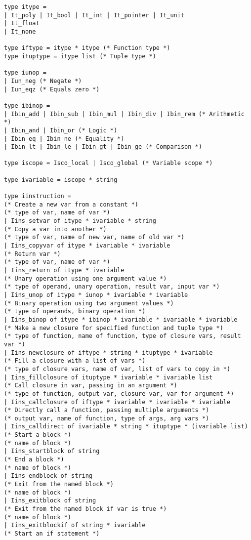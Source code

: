 \documentclass[12pt,twoside,notitlepage]{report}
\begin{document}
\begin{verbatim}
type itype =
| It_poly | It_bool | It_int | It_pointer | It_unit
| It_float
| It_none

type iftype = itype * itype (* Function type *)
type ituptype = itype list (* Tuple type *)

type iunop =
| Iun_neg (* Negate *)
| Iun_eqz (* Equals zero *)

type ibinop =
| Ibin_add | Ibin_sub | Ibin_mul | Ibin_div | Ibin_rem (* Arithmetic *)
| Ibin_and | Ibin_or (* Logic *)
| Ibin_eq | Ibin_ne (* Equality *)
| Ibin_lt | Ibin_le | Ibin_gt | Ibin_ge (* Comparison *)

type iscope = Isco_local | Isco_global (* Variable scope *)

type ivariable = iscope * string

type iinstruction =
(* Create a new var from a constant *)
(* type of var, name of var *)
| Iins_setvar of itype * ivariable * string
(* Copy a var into another *)
(* type of var, name of new var, name of old var *)
| Iins_copyvar of itype * ivariable * ivariable
(* Return var *)
(* type of var, name of var *)
| Iins_return of itype * ivariable
(* Unary operation using one argument value *)
(* type of operand, unary operation, result var, input var *)
| Iins_unop of itype * iunop * ivariable * ivariable
(* Binary operation using two argument values *)
(* type of operands, binary operation *)
| Iins_binop of itype * ibinop * ivariable * ivariable * ivariable
(* Make a new closure for specified function and tuple type *)
(* type of function, name of function, type of closure vars, result var *)
| Iins_newclosure of iftype * string * ituptype * ivariable
(* Fill a closure with a list of vars *)
(* type of closure vars, name of var, list of vars to copy in *)
| Iins_fillclosure of ituptype * ivariable * ivariable list
(* Call closure in var, passing in an argument *)
(* type of function, output var, closure var, var for argument *)
| Iins_callclosure of iftype * ivariable * ivariable * ivariable
(* Directly call a function, passing multiple arguments *)
(* output var, name of function, type of args, arg vars *)
| Iins_calldirect of ivariable * string * ituptype * (ivariable list)
(* Start a block *)
(* name of block *)
| Iins_startblock of string
(* End a block *)
(* name of block *)
| Iins_endblock of string
(* Exit from the named block *)
(* name of block *)
| Iins_exitblock of string
(* Exit from the named block if var is true *)
(* name of block *)
| Iins_exitblockif of string * ivariable
(* Start an if statement *)

\end{verbatim}
\end{document}
